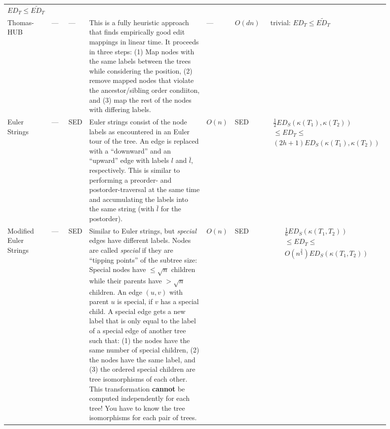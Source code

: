 \documentclass{article}
\begin{document}
\begin{footnotesize}
\begin{longtable}[c]{p{0.085\linewidth}p{0.05\linewidth}p{0.035\linewidth}p{0.43\linewidth}p{0.05\linewidth}p{0.1\linewidth}p{0.15\linewidth}}
        $ED_T\leq \widetilde{ED_T}$
        \tabularnewline
        Thomas-HUB~\cite{DBLP:conf/icde/Hutter0LA19}&
        ---&
        ---&
        This is a fully heuristic approach that finds empirically good edit mappings in linear time. It proceeds in three steps: (1) Map nodes with the same labels between the trees while considering the position, (2) remove mapped nodes that violate the ancestor/sibling order condiiton, and (3) map the rest of the nodes with differing labels.&
        ---&
        $O(dn)$&
        trivial: $ED_T\leq \widetilde{ED_T}$
        \tabularnewline
        Euler Strings~\cite{DBLP:journals/ipl/Akutsu06}&
        ---&
        SED&
        Euler strings consist of the node labels as encountered in an Euler tour of the tree. An edge is replaced with a \enquote{downward} and an \enquote{upward} edge with labels $l$ and $\bar{l}$, respectively. This is similar to performing a preorder- and postorder-traversal at the same time and accumulating the labels into the same string (with $\bar{l}$ for the postorder).   &   
        $O(n)$  &
        SED &
        \begin{gather*}\frac{1}{2} ED_S(\kappa(T_1), \kappa(T_2)) \\ \leq ED_T \leq \\ (2h+1) ED_S(\kappa(T_1), \kappa(T_2))\end{gather*}
        \tabularnewline
        Modified Euler Strings~\cite{DBLP:journals/algorithmica/AkutsuFT10}  &
        --- &
        SED &   
        Similar to Euler strings, but \textit{special} edges have different labels. Nodes are called \textit{special} if they are \enquote{tipping points} of the subtree size: Special nodes have ${\leq} \sqrt{n}$ children while their parents have ${>}\sqrt{n}$ children. An edge $(u,v)$ with parent $u$ is special, if $v$ has a special child. A special edge gets a new label that is only equal to the label of a special edge of another tree such that: (1) the nodes have the same number of special children, (2) the nodes have the same label, and (3) the ordered special children are tree isomorphisms of each other. This transformation \textbf{cannot} be computed independently for each tree! You have to know the tree isomorphisms for each pair of trees. &
        $O(n)$  &
        SED &
        \begin{gather*}
            \frac{1}{6} ED_S(\kappa(T_1, T_2))\\
            \leq ED_T \leq \\
            O(n^{\frac{3}{4}}) ED_S(\kappa(T_1, T_2))
        \end{gather*}

\end{longtable}
\end{footnotesize}
\end{document}
